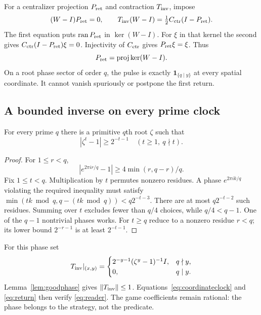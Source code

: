 For a centralizer projection $P_{\rm ret}$ and contraction $T_{\rm inv}$, impose
\begin{equation}\label{eq:reader}
 (W-I)P_{\rm ret}=0,\qquad T_{\rm inv}(W-I)=\tfrac12 C_{\rm ctr}(I-P_{\rm ret}).
\end{equation}
The first equation puts $\operatorname{ran} P_{\rm ret}$ in $\ker(W-I)$. For $\xi$ in that kernel the second gives $C_{\rm ctr}(I-P_{\rm ret})\xi=0$. Injectivity of $C_{\rm ctr}$ gives $P_{\rm ret}\xi=\xi$. Thus
\begin{equation}\label{eq:return}
 P_{\rm ret}=\operatorname{proj}\ker(W-I).
\end{equation}
On a root phase sector of order $q$, the pulse is exactly $\mathbf1_{\{q\mid y\}}$ at every spatial coordinate. It cannot vanish spuriously or postpone the first return.

\subsection{A bounded inverse on every prime clock}
\begin{lemma}\label{lem:goodphase}
For every prime $q$ there is a primitive $q$th root $\zeta$ such that
\[
 |\zeta^t-1|\geq2^{-t-1}\quad(t\geq1,\ q\nmid t).
\]
\end{lemma}
\begin{proof}
For $1\leq r<q$,
\[
 |e^{2\pi ir/q}-1|\geq4\min(r,q-r)/q.
\]
Fix $1\leq t<q$. Multiplication by $t$ permutes nonzero residues. A phase $e^{2\pi ik/q}$ violating the required inequality must satisfy $\min(tk\bmod q,q-(tk\bmod q))<q2^{-t-3}$. There are at most $q2^{-t-2}$ such residues. Summing over $t$ excludes fewer than $q/4$ choices, while $q/4<q-1$. One of the $q-1$ nontrivial phases works. For $t\geq q$ reduce to a nonzero residue $r<q$; its lower bound $2^{-r-1}$ is at least $2^{-t-1}$.
\end{proof}

For this phase set
\begin{equation}\label{eq:D}
 T_{\rm inv}|_{(x,y)}=
 \begin{cases}
 2^{-y-1}(\zeta^y-1)^{-1}I,&q\nmid y,\\
 0,&q\mid y.
 \end{cases}
\end{equation}
Lemma~\ref{lem:goodphase} gives $\|T_{\rm inv}\|\leq1$. Equations~\eqref{eq:coordinateclock} and \eqref{eq:return} then verify \eqref{eq:reader}. The game coefficients remain rational: the phase belongs to the strategy, not the predicate.
